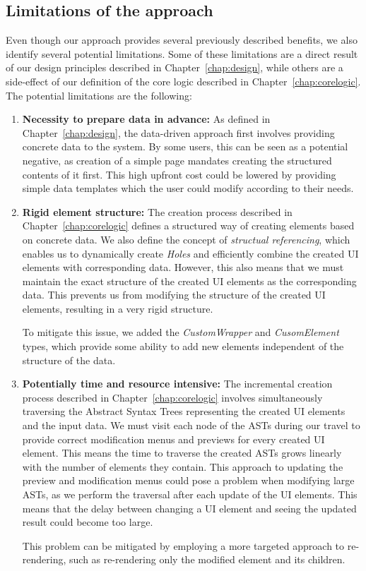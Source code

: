 \subsection{Limitations of the approach}
Even though our approach provides several previously described benefits, we also identify several potential limitations.
Some of these limitations are a direct result of our design principles described in Chapter~\ref{chap:design}, while others are
a side-effect of our definition of the core logic described in Chapter~\ref{chap:corelogic}.
The potential limitations are the following:
\begin{enumerate}
	\item \textbf{Necessity to prepare data in advance:} As defined in Chapter~\ref{chap:design}, the data-driven approach first involves providing concrete data to the system.
	      By some users, this can be seen as a potential negative, as creation of a simple page mandates creating the structured contents of it first.
	      This high upfront cost could be lowered by providing simple data templates which the user could modify according to their needs.
	\item \textbf{Rigid element structure:} The creation process described in Chapter~\ref{chap:corelogic} defines a structured way
	      of creating elements based on concrete data.
	      We also define the concept of \emph{structual referencing}, which enables us to dynamically create \emph{Holes} and efficiently combine the created UI elements with corresponding data.
	      However, this also means that we must maintain the exact structure of the created UI elements as the corresponding data.
	      This prevents us from modifying the structure of the created UI elements, resulting in a very rigid structure.

	      To mitigate this issue, we added the \emph{CustomWrapper} and \emph{CusomElement} types, which provide some ability to add new elements independent of the
	      structure of the data.
	\item \textbf{Potentially time and resource intensive:} The incremental creation process described in Chapter~\ref{chap:corelogic} involves simultaneously traversing the Abstract Syntax Trees representing the created UI elements and the input data.
	      We must visit each node of the ASTs during our travel to provide correct modification menus and previews for every created UI element.
	      This means the time to traverse the created ASTs grows linearly with the number of elements they contain.
	      This approach to updating the preview and modification menus could pose a problem when modifying large ASTs, as we perform the traversal after each update of the UI elements.
	      This means that the delay between changing a UI element and seeing the updated result could become too large.

	      This problem can be mitigated by employing a more targeted approach to re-rendering, such as re-rendering only the modified element and its children.

\end{enumerate}

